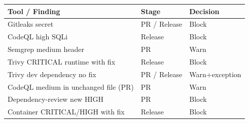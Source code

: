 \begin{tabular}{lll}
\toprule
Tool / Finding & Stage & Decision \\
\midrule
Gitleaks secret & PR / Release & Block \\
CodeQL high SQLi & Release & Block \\
Semgrep medium header & PR & Warn \\
Trivy CRITICAL runtime with fix & Release & Block \\
Trivy dev dependency no fix & PR / Release & Warn+exception \\
CodeQL medium in unchanged file (PR) & PR & Warn \\
Dependency-review new HIGH & PR & Block \\
Container CRITICAL/HIGH with fix & Release & Block \\
\bottomrule
\end{tabular}
